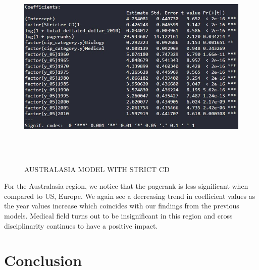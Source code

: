 \documentclass[a4paper,11pt]{article}
\theoremstyle{mytheor}
\begin{document}
\newpage
\begin{figure}[ht]
    \centering
    \includegraphics[width=16cm, height=10cm]{aus_coeff_str.jpg}
    \caption{AUSTRALASIA MODEL WITH STRICT CD}
    \label{fig:AUSTRALASIA STRICT CORRELATION}
\end{figure} 
\FloatBarrier

For the Australasia region, we notice that the pagerank is less significant when compared to US, Europe. We again see a decreasing trend in coefficient values as the year values increase which coincides with our findings from the previous models. Medical field turns out to be insignificant in this region and cross disciplinarity continues to have a positive impact. 

\section*{Conclusion}
\end{document}
